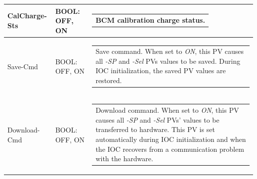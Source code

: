 \documentclass[openany]{article}
\begin{document}
\begin{longtable}{| m{3.0cm} m{4.5cm} m{7.0cm} |}
		CalCharge-Sts & BOOL: OFF, ON & \begin{tabular}{@{}m{6cm}@{}}
 						BCM calibration charge status.
						\end{tabular} \\ \hline
		Save-Cmd & BOOL: OFF, ON & \begin{tabular}{@{}m{6cm}@{}}
 						Save command. When set to \emph{ON}, this PV causes all \emph{-SP} and \emph{-Sel} PVs values to be saved. During IOC initialization, the saved PV values are restored.
						\end{tabular} \\ \hline
		Download-Cmd & BOOL: OFF, ON & \begin{tabular}{@{}m{6cm}@{}}
 						Download command. When set to \emph{ON}, this PV causes all \emph{-SP} and \emph{-Sel} PVs' values to be transferred to hardware. This PV is set automatically during IOC initialization and when the IOC recovers from a communication problem with the hardware.
						\end{tabular} \\ \hline

	\end{longtable}
\end{document}
